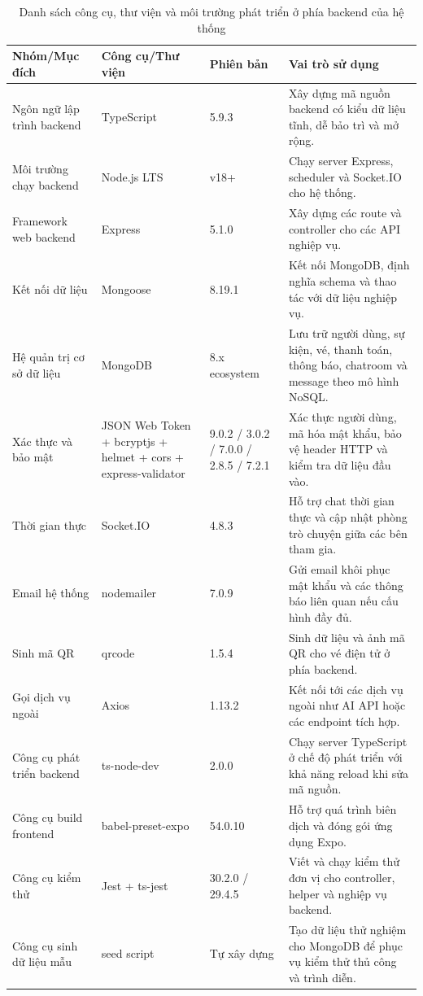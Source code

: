 \documentclass[../DoAn.tex]{subfiles}
\begin{document}
\begin{table}[H]
\centering
\scriptsize
\renewcommand{\arraystretch}{1.2}
\begin{tabular}{|p{2.5cm}|p{2.9cm}|p{1.8cm}|p{6.3cm}|}
\hline
\textbf{Nhóm/Mục đích} & \textbf{Công cụ/Thư viện} & \textbf{Phiên bản} & \textbf{Vai trò sử dụng} \\ \hline
Ngôn ngữ lập trình backend & TypeScript & 5.9.3 & Xây dựng mã nguồn backend có kiểu dữ liệu tĩnh, dễ bảo trì và mở rộng. \\ \hline
Môi trường chạy backend & Node.js LTS & v18+ & Chạy server Express, scheduler và Socket.IO cho hệ thống. \\ \hline
Framework web backend & Express & 5.1.0 & Xây dựng các route và controller cho các \gls{API} nghiệp vụ. \\ \hline
Kết nối dữ liệu & Mongoose & 8.19.1 & Kết nối MongoDB, định nghĩa schema và thao tác với dữ liệu nghiệp vụ. \\ \hline
Hệ quản trị cơ sở dữ liệu & MongoDB & 8.x ecosystem & Lưu trữ người dùng, sự kiện, vé, thanh toán, thông báo, chatroom và message theo mô hình NoSQL. \\ \hline
Xác thực và bảo mật & JSON Web Token + bcryptjs + helmet + cors + express-validator & 9.0.2 / 3.0.2 / 7.0.0 / 2.8.5 / 7.2.1 & Xác thực người dùng, mã hóa mật khẩu, bảo vệ header HTTP và kiểm tra dữ liệu đầu vào. \\ \hline
Thời gian thực & Socket.IO & 4.8.3 & Hỗ trợ chat thời gian thực và cập nhật phòng trò chuyện giữa các bên tham gia. \\ \hline
Email hệ thống & nodemailer & 7.0.9 & Gửi email khôi phục mật khẩu và các thông báo liên quan nếu cấu hình đầy đủ. \\ \hline
Sinh mã QR & qrcode & 1.5.4 & Sinh dữ liệu và ảnh mã \gls{QR} cho vé điện tử ở phía backend. \\ \hline
Gọi dịch vụ ngoài & Axios & 1.13.2 & Kết nối tới các dịch vụ ngoài như AI API hoặc các endpoint tích hợp. \\ \hline
Công cụ phát triển backend & ts-node-dev & 2.0.0 & Chạy server TypeScript ở chế độ phát triển với khả năng reload khi sửa mã nguồn. \\ \hline
Công cụ build frontend & babel-preset-expo & 54.0.10 & Hỗ trợ quá trình biên dịch và đóng gói ứng dụng Expo. \\ \hline
Công cụ kiểm thử & Jest + ts-jest & 30.2.0 / 29.4.5 & Viết và chạy kiểm thử đơn vị cho controller, helper và nghiệp vụ backend. \\ \hline
Công cụ sinh dữ liệu mẫu & seed script & Tự xây dựng & Tạo dữ liệu thử nghiệm cho MongoDB để phục vụ kiểm thử thủ công và trình diễn. \\ \hline
\end{tabular}
\caption{Danh sách công cụ, thư viện và môi trường phát triển ở phía backend của hệ thống}
\label{table:my_label_backend}
\end{table}
\end{document}
